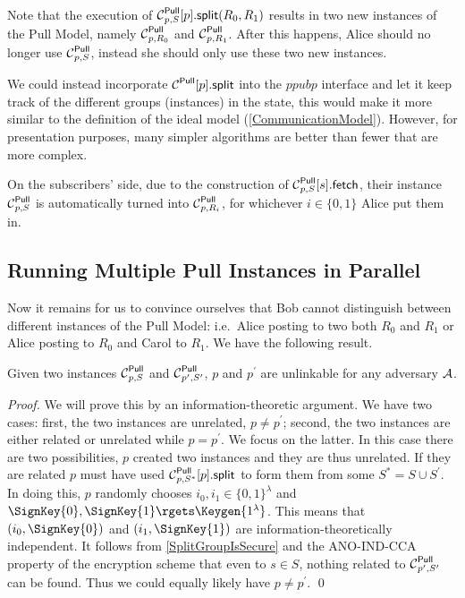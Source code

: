 Note that the execution of \(\psplit[p, S]{p}[R_0, R_1]\) results in two new 
instances of the Pull Model, namely \(\Pull[p, R_0]\) and \(\Pull[p, R_1]\).
After this happens, Alice should no longer use \(\Pull[p, S]\), instead she 
should only use these two new instances.

We could instead incorporate \(\psplit{p}\) into the \(ppub{p}\) interface and 
let it keep track of the different groups (instances) in the state, this would 
make it more similar to the definition of the ideal model 
(\cref{CommunicationModel}).
However, for presentation purposes, many simpler algorithms are better than 
fewer that are more complex.

On the subscribers' side, due to the construction of \(\pget[p, S]{s}\), their 
instance \(\Pull[p, S]\) is automatically turned into \(\Pull[p, R_i]\), for 
whichever \(i\in \{0, 1\}\) Alice put them in.

\subsection{Running Multiple Pull Instances in Parallel}
\label{ParallelPull}

Now it remains for us to convince ourselves that Bob cannot distinguish between
different instances of the Pull Model: i.e.\ Alice posting to two both \(R_0\) 
and \(R_1\) or Alice posting to \(R_0\) and Carol to \(R_1\).
We have the following result.

\begin{theorem}
  Given two instances \(\Pull[p, S]\) and \(\Pull[p^\prime, S^\prime]\), \(p\) 
  and \(p^\prime\) are unlinkable for any adversary \(\A\).
\end{theorem}

\begin{proof}
  We will prove this by an information-theoretic argument.
  We have two cases: first, the two instances are unrelated, \(p\neq 
    p^\prime\); second, the two instances are either related or unrelated while 
  \(p = p^\prime\).
  We focus on the latter.
  In this case there are two possibilities, \(p\) created two instances and 
  they are thus unrelated.
  If they are related \(p\) must have used \(\psplit[p, S^*]{p}\) to form them 
  from some \(S^* = S\cup S^\prime\).
  In doing this, \(p\) randomly chooses \(i_0, i_1\in \{0, 1\}^\lambda\) and 
  \(\SignKey{0}, \SignKey{1}\rgets \Keygen{1^\lambda}\).
  This means that \((i_0, \SignKey{0})\) and \((i_1, \SignKey{1})\) are 
  information-theoretically independent.
  It follows from \cref{SplitGroupIsSecure} and the ANO-IND-CCA property of the 
  encryption scheme that even to \(s\in S\), nothing related to 
  \(\Pull[p^\prime, S^\prime]\) can be found.
  Thus we could equally likely have \(p\neq p^\prime\).
  \qed{}
\end{proof}


